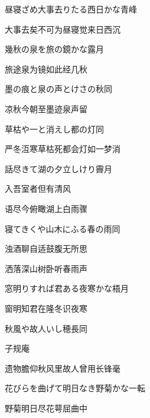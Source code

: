 \begin{haiku}
    {\FH 昼寝ざめ大事去りたる西日かな}\hfill{\FH 青峰}

    {\FK 大事去矣不可为昼寝觉来日西沉}
\end{haiku}

\begin{haiku}
    {\FH 幾秋の泉を旅の鏡かな}\hfill{\FH 露月}

    {\FK 旅途泉为镜如此经几秋}
\end{haiku}

\begin{haiku}
    {\FH 墨の痕と泉の声とけさの秋}\hfill{\FH 同}

    {\FK 凉秋今朝至墨迹泉声留}
\end{haiku}

\begin{haiku}
    {\FH 草枯や一と消えし都の灯}\hfill{\FH 同}

    {\FK 严冬沍寒草枯死都会灯如一梦消}
\end{haiku}

\begin{haiku}
    {\FH 話尽きて湖の夕立しけり}\hfill{\FH 霽月}

    {\FK 入吾室者但有清风}

    {\FK 语尽今俯瞰湖上白雨骤}
\end{haiku}

\begin{haiku}
    {\FH 寝てきくや山木にふる春の雨}\hfill{\FH 同}

    {\FK 浊酒聊自适鼓腹无所思}

    {\FK 洒落深山树卧听春雨声}
\end{haiku}

\begin{haiku}
    {\FH 窓明りすれば君ある夜寒かな}\hfill{\FH 梧月}

    {\FK 窗明知君在隆冬识夜寒}
\end{haiku}

\begin{haiku}
    {\FH 秋風や故人いし穂長}\hfill{\FH 同}

    {\FK 子规庵}

    {\FK 遗物膽仰秋风里故人曾用长锋毫}
\end{haiku}

\begin{haiku}
    {\FH 花びらを曲げて明日なき野菊かな}\hfill{\FH 一転}

    {\FK 野菊明日尽花萼屈曲中}
\end{haiku}

